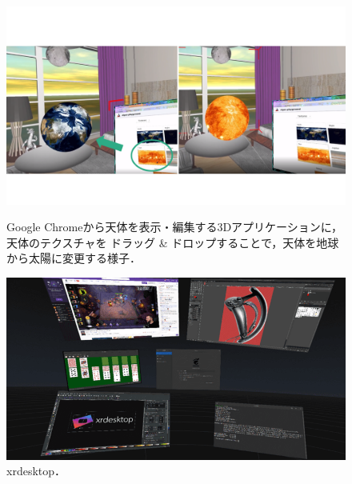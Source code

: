 \begin{figure}[htbp]
  \begin{minipage}[t]{0.50\linewidth}
    \centering
    \includegraphics[keepaspectratio, width=\linewidth]{fig/dnd.png}
    \caption{
      Google Chromeから天体を表示・編集する3Dアプリケーションに，天体のテクスチャを
      ドラッグ \& ドロップすることで，天体を地球から太陽に変更する様子．
    }
    \label{fig:dnd}
  \end{minipage}
  \begin{minipage}[t]{0.50\linewidth}
    \centering
    \includegraphics[keepaspectratio, width=\linewidth]{fig/xrdesktop.png}
    \caption{xrdesktop．}
    \label{fig:xrdesktop}
  \end{minipage}
\end{figure}
